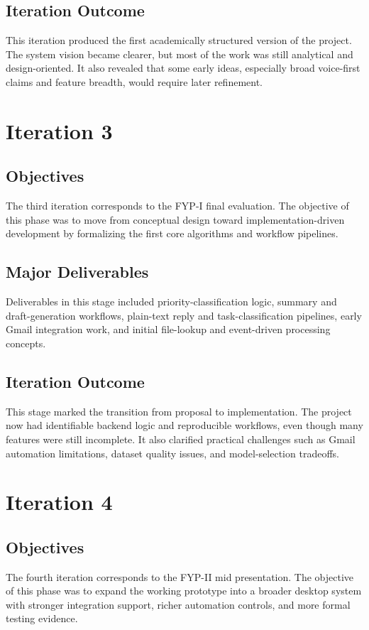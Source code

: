 \subsection{Iteration Outcome}
This iteration produced the first academically structured version of the project. The system vision became clearer, but most of the work was still analytical and design-oriented. It also revealed that some early ideas, especially broad voice-first claims and feature breadth, would require later refinement.

\section{Iteration 3}
\subsection{Objectives}
The third iteration corresponds to the FYP-I final evaluation. The objective of this phase was to move from conceptual design toward implementation-driven development by formalizing the first core algorithms and workflow pipelines.

\subsection{Major Deliverables}
Deliverables in this stage included priority-classification logic, summary and draft-generation workflows, plain-text reply and task-classification pipelines, early Gmail integration work, and initial file-lookup and event-driven processing concepts.

\subsection{Iteration Outcome}
This stage marked the transition from proposal to implementation. The project now had identifiable backend logic and reproducible workflows, even though many features were still incomplete. It also clarified practical challenges such as Gmail automation limitations, dataset quality issues, and model-selection tradeoffs.

\section{Iteration 4}
\subsection{Objectives}
The fourth iteration corresponds to the FYP-II mid presentation. The objective of this phase was to expand the working prototype into a broader desktop system with stronger integration support, richer automation controls, and more formal testing evidence.

